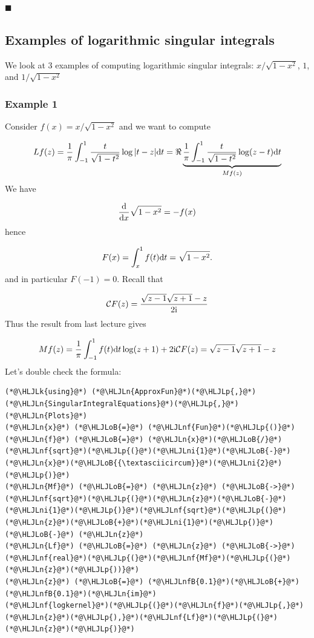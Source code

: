 \documentclass[12pt,landscape]{article}
\newcommand{\HLJLk}[1]{\textcolor[RGB]{148,91,176}{\textbf{#1}}}
\newcommand{\HLJLn}[1]{#1}
\newcommand{\HLJLnf}[1]{\textcolor[RGB]{66,102,213}{#1}}
\newcommand{\HLJLnfB}[1]{\textcolor[RGB]{59,151,46}{#1}}
\newcommand{\HLJLni}[1]{\textcolor[RGB]{59,151,46}{#1}}
\newcommand{\HLJLoB}[1]{\textcolor[RGB]{102,102,102}{\textbf{#1}}}
\newcommand{\HLJLp}[1]{#1}
\def\D{ {\rm d} }
\def\I{ {\rm i} }
\def\CC{ {\cal C} }
\def\dx{\D x}
\begin{document}
{\ensuremath{\blacksquare}

\subsection{Examples of logarithmic singular integrals}
We look at 3 examples of computing logarithmic singular integrals: $x/\sqrt{1-x^2}$, $1$, and $1/\sqrt{1-x^2}$

\subsubsection{Example 1}
Consider $f(x) = x/\sqrt{1-x^2}$ and we want to compute

\[
L f(z) = {1 \over \pi} \int_{-1}^1 {t \over \sqrt{1-t^2}} \log|t-z| \D t = \Re \underbrace{{1 \over \pi} \int_{-1}^1 {t \over \sqrt{1-t^2}} \log(z-t) \D t }_{M f(z)}
\]
We have

\[
{\D \over \dx} \sqrt{1-x^2} = - f(x)
\]
hence

\[
F(x) = \int_x^1 f(t) \D t = \sqrt{1-x^2}.
\]
and in particular $F(-1) = 0$. Recall that

\[
\CC F(z) = {\sqrt{z-1} \sqrt{z+1} - z\over 2 \I}
\]
Thus the result from last lecture gives

\[
M f(z) = {1 \over \pi} \int_{-1}^1 f(t) \D t \log(z+1)+ 2 \I \CC F(z) = \sqrt{z-1} \sqrt{z+1} - z
\]
Let's double check the formula:


\begin{lstlisting}
(*@\HLJLk{using}@*) (*@\HLJLn{ApproxFun}@*)(*@\HLJLp{,}@*) (*@\HLJLn{SingularIntegralEquations}@*)(*@\HLJLp{,}@*) (*@\HLJLn{Plots}@*)
(*@\HLJLn{x}@*) (*@\HLJLoB{=}@*) (*@\HLJLnf{Fun}@*)(*@\HLJLp{()}@*)
(*@\HLJLn{f}@*) (*@\HLJLoB{=}@*) (*@\HLJLn{x}@*)(*@\HLJLoB{/}@*)(*@\HLJLnf{sqrt}@*)(*@\HLJLp{(}@*)(*@\HLJLni{1}@*)(*@\HLJLoB{-}@*)(*@\HLJLn{x}@*)(*@\HLJLoB{{\textasciicircum}}@*)(*@\HLJLni{2}@*)(*@\HLJLp{)}@*)
(*@\HLJLn{Mf}@*) (*@\HLJLoB{=}@*) (*@\HLJLn{z}@*) (*@\HLJLoB{->}@*) (*@\HLJLnf{sqrt}@*)(*@\HLJLp{(}@*)(*@\HLJLn{z}@*)(*@\HLJLoB{-}@*)(*@\HLJLni{1}@*)(*@\HLJLp{)}@*)(*@\HLJLnf{sqrt}@*)(*@\HLJLp{(}@*)(*@\HLJLn{z}@*)(*@\HLJLoB{+}@*)(*@\HLJLni{1}@*)(*@\HLJLp{)}@*) (*@\HLJLoB{-}@*) (*@\HLJLn{z}@*)
(*@\HLJLn{Lf}@*) (*@\HLJLoB{=}@*) (*@\HLJLn{z}@*) (*@\HLJLoB{->}@*) (*@\HLJLnf{real}@*)(*@\HLJLp{(}@*)(*@\HLJLnf{Mf}@*)(*@\HLJLp{(}@*)(*@\HLJLn{z}@*)(*@\HLJLp{))}@*)
(*@\HLJLn{z}@*) (*@\HLJLoB{=}@*) (*@\HLJLnfB{0.1}@*)(*@\HLJLoB{+}@*)(*@\HLJLnfB{0.1}@*)(*@\HLJLn{im}@*)
(*@\HLJLnf{logkernel}@*)(*@\HLJLp{(}@*)(*@\HLJLn{f}@*)(*@\HLJLp{,}@*)(*@\HLJLn{z}@*)(*@\HLJLp{),}@*)(*@\HLJLnf{Lf}@*)(*@\HLJLp{(}@*)(*@\HLJLn{z}@*)(*@\HLJLp{)}@*)
\end{lstlisting}

}
\end{document}
